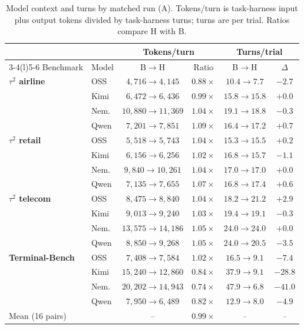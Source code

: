 \documentclass[11pt,letterpaper]{article}
\begin{document}
\begin{table}[H]
\centering\scriptsize
\setlength{\tabcolsep}{3pt}
\caption{Model context and turns by matched run (A). Tokens/turn is
task-harness input plus output tokens divided by task-harness turns;
turns are per trial. Ratios compare H with B.}
\label{tab:cost}
\begin{tabular*}{\linewidth}{@{\extracolsep{\fill}}llcccc@{}}
\toprule
 & & \multicolumn{2}{c}{Tokens/turn} & \multicolumn{2}{c}{Turns/trial} \\
\cmidrule(lr){3-4}\cmidrule(l){5-6}
Benchmark & Model & B$\to$H & Ratio & B$\to$H & $\Delta$ \\
\midrule
\textbf{$\tau^2$ airline} & OSS & $4{,}716\to4{,}145$ & $0.88\times$ & $10.4\to7.7$ & $-2.7$ \\
 & Kimi & $6{,}472\to6{,}436$ & $0.99\times$ & $15.8\to15.8$ & $+0.0$ \\
 & Nem. & $10{,}880\to11{,}369$ & $1.04\times$ & $19.1\to18.8$ & $-0.3$ \\
 & Qwen & $7{,}201\to7{,}851$ & $1.09\times$ & $16.4\to17.2$ & $+0.7$ \\
\midrule
\textbf{$\tau^2$ retail} & OSS & $5{,}518\to5{,}743$ & $1.04\times$ & $15.3\to15.5$ & $+0.2$ \\
 & Kimi & $6{,}156\to6{,}256$ & $1.02\times$ & $16.8\to15.7$ & $-1.1$ \\
 & Nem. & $9{,}840\to10{,}261$ & $1.04\times$ & $17.0\to17.0$ & $+0.0$ \\
 & Qwen & $7{,}135\to7{,}655$ & $1.07\times$ & $16.8\to17.4$ & $+0.6$ \\
\midrule
\textbf{$\tau^2$ telecom} & OSS & $8{,}475\to8{,}840$ & $1.04\times$ & $18.2\to21.2$ & $+2.9$ \\
 & Kimi & $9{,}013\to9{,}240$ & $1.03\times$ & $19.4\to19.1$ & $-0.3$ \\
 & Nem. & $13{,}575\to14{,}186$ & $1.05\times$ & $24.0\to24.0$ & $+0.0$ \\
 & Qwen & $8{,}850\to9{,}268$ & $1.05\times$ & $24.0\to20.5$ & $-3.5$ \\
\midrule
\textbf{Terminal-Bench} & OSS & $7{,}408\to7{,}584$ & $1.02\times$ & $16.5\to9.1$ & $-7.4$ \\
 & Kimi & $15{,}240\to12{,}860$ & $0.84\times$ & $37.9\to9.1$ & $-28.8$ \\
 & Nem. & $20{,}202\to14{,}943$ & $0.74\times$ & $47.9\to6.8$ & $-41.0$ \\
 & Qwen & $7{,}950\to6{,}489$ & $0.82\times$ & $12.9\to8.0$ & $-4.9$ \\
\midrule
Mean (16 pairs) & & -- & $0.99\times$ & -- & -- \\
\bottomrule
\end{tabular*}
\end{table}
\end{document}
